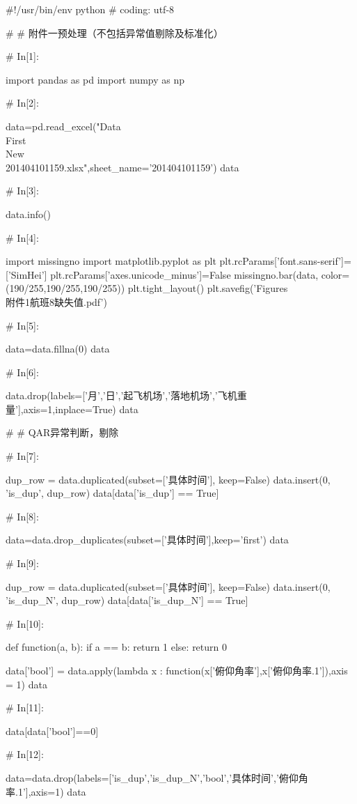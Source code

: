 \documentclass{MathorCupModeling}
\begin{document}
\begin{python}
#!/usr/bin/env python
# coding: utf-8

# # 附件一预处理（不包括异常值剔除及标准化）

# In[1]:


import pandas as pd
import numpy as np


# In[2]:


data=pd.read_excel("Data\\First\\New\\201404101159.xlsx",sheet_name='201404101159')
data


# In[3]:


data.info()


# In[4]:


import missingno
import matplotlib.pyplot as plt
plt.rcParams['font.sans-serif']=['SimHei']
plt.rcParams['axes.unicode_minus']=False
missingno.bar(data, color=(190/255,190/255,190/255))
plt.tight_layout()
plt.savefig('Figures\\附件1航班8缺失值.pdf')


# In[5]:


data=data.fillna(0)
data


# In[6]:


data.drop(labels=['月','日','起飞机场','落地机场','飞机重量'],axis=1,inplace=True)
data


# # QAR异常判断，剔除

# In[7]:


dup_row = data.duplicated(subset=['具体时间'], keep=False)
data.insert(0, 'is_dup', dup_row)
data[data['is_dup'] == True]


# In[8]:


data=data.drop_duplicates(subset=['具体时间'],keep='first')
data


# In[9]:


dup_row = data.duplicated(subset=['具体时间'], keep=False)
data.insert(0, 'is_dup_N', dup_row)
data[data['is_dup_N'] == True]


# In[10]:


def function(a, b):
    if a == b:
        return 1
    else:
        return 0


data['bool'] = data.apply(lambda x : function(x['俯仰角率'],x['俯仰角率.1']),axis = 1)
data


# In[11]:


data[data['bool']==0]


# In[12]:


data=data.drop(labels=['is_dup','is_dup_N','bool','具体时间','俯仰角率.1'],axis=1)
data


\end{python}
\end{document}

